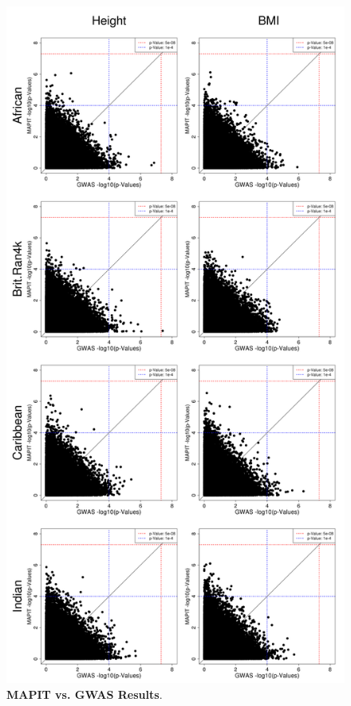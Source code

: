 \documentclass[12pt, a4paper]{article}
\begin{document}
\begin{figure}[htbp]
\centering
\hspace*{-.5cm}
\includegraphics[scale=.3]{Images/Supp/InterPath_Supp_Figure_MAPITvsGWAS_vs2.png}
\caption[TBD]{\textbf{MAPIT vs. GWAS Results}.}
\label{InterPath-Supp-Figure-MAPITvsGWAS}
\end{figure}
\end{document}

